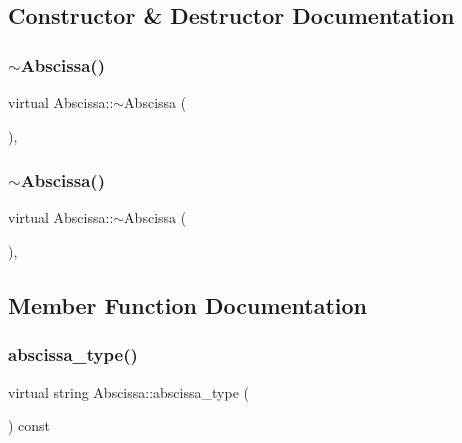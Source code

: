 \subsection{Constructor \& Destructor Documentation}
\mbox{\label{classAbscissa_a09c550b42b7a2532a7df473ec008994e}} 
\subsubsection{\texorpdfstring{$\sim$Abscissa()}{~Abscissa()}\hspace{0.1cm}{\footnotesize\ttfamily [1/2]}}
{\footnotesize\ttfamily virtual Abscissa\+::$\sim$\+Abscissa (\begin{DoxyParamCaption}{ }\end{DoxyParamCaption})\hspace{0.3cm}{\ttfamily [inline]}, {\ttfamily [virtual]}}

\mbox{\label{classAbscissa_a09c550b42b7a2532a7df473ec008994e}} 
\subsubsection{\texorpdfstring{$\sim$Abscissa()}{~Abscissa()}\hspace{0.1cm}{\footnotesize\ttfamily [2/2]}}
{\footnotesize\ttfamily virtual Abscissa\+::$\sim$\+Abscissa (\begin{DoxyParamCaption}{ }\end{DoxyParamCaption})\hspace{0.3cm}{\ttfamily [inline]}, {\ttfamily [virtual]}}



\subsection{Member Function Documentation}
\mbox{\label{classAbscissa_af57ffcd07eee633bb2313bc7a932f3bb}} 
\subsubsection{\texorpdfstring{abscissa\_type()}{abscissa\_type()}\hspace{0.1cm}{\footnotesize\ttfamily [1/2]}}
{\footnotesize\ttfamily virtual string Abscissa\+::abscissa\+\_\+type (\begin{DoxyParamCaption}{ }\end{DoxyParamCaption}) const\hspace{0.3cm}{\ttfamily [pure virtual]}}



